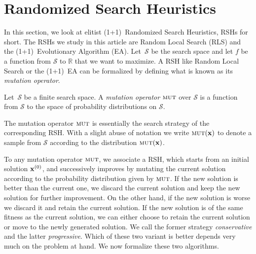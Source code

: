 \documentclass[a4paper,11pt]{article}
\begin{document}
\section{Randomized Search Heuristics}
\label{sec:rsh}
In this section, we look at elitist (1+1)~Randomized Search Heuristics, RSHs for short. The RSHs we study in this article are Random Local Search (RLS) and the (1+1)~Evolutionary Algorithm (EA). Let~$\mathcal{S}$ be the search space and let $f$ be a function from $\mathcal{S}$ to $\mathbb{R}$ that we want to maximize. A RSH like Random Local Search or the (1+1)~EA can be formalized by defining what is known as its \emph{mutation operator}.

\begin{definition}
Let~$\mathcal{S}$ be a finite search space. A \emph{mutation operator} $\textsc{mut}$ over $\mathcal{S}$ is a function from $\mathcal{S}$ to the space of probability distributions on $\mathcal{S}$.
\end{definition}

The mutation operator $\textsc{mut}$ is essentially the search strategy of the corresponding RSH. With a slight abuse of notation we write $\mut(\xvec)$ to denote a sample from $\mathcal{S}$ according to the distribution $\mut(\xvec)$.

To any mutation operator $\textsc{mut}$, we associate a RSH, which starts from an initial solution $\xvec[0]$, and successively improves by mutating the current solution according to the probability distribution given by $\textsc{mut}$. If the new solution is better than the current one, we discard the current solution and keep the new solution for further improvement. On the other hand, if the new solution is worse we discard it and retain the current solution. If the new solution is of the same fitness as the current solution, we can either choose to retain the current solution or move to the newly generated solution. We call the former strategy \emph{conservative} and the latter \emph{progressive}. Which of these two variant is better depends very much on the problem at hand. We now formalize these two algorithms.
\end{document}
